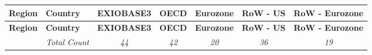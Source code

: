 \begin{longtable}{>{\raggedright\arraybackslash}p{2.0cm} l c c c c c}
\toprule
\textbf{Region} & \textbf{Country} & \textbf{EXIOBASE3} & \textbf{OECD} & \textbf{Eurozone} & \textbf{RoW - US} & \textbf{RoW - Eurozone} \\
\midrule[1pt]
\endfirsthead

\toprule
\textbf{Region} & \textbf{Country} & \textbf{EXIOBASE3} & \textbf{OECD} & \textbf{Eurozone} & \textbf{RoW - US} & \textbf{RoW - Eurozone} \\
\midrule[1pt]
\endhead

\midrule
\endfoot

\bottomrule
\endlastfoot

& \textit{Total Count} & \textit{44} & \textit{42} & \textit{20} & \textit{36} & \textit{19} \\
\midrule[1pt] %


\end{longtable}
